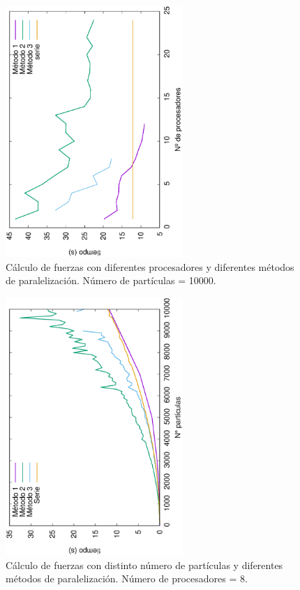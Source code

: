 \documentclass[onecolumn]{article}
\begin{document}
\begin{figure}[h]
\begin{center}
\includegraphics[width=0.6\textwidth, angle=-90]{forces_proc3.eps}
\caption{Cálculo de fuerzas con diferentes procesadores y diferentes métodos de paralelización. Número de partículas = 10000.}
\label{xabi_2}
\end{center}
\end{figure}

\begin{figure}[h]
\begin{center}
\includegraphics[width=0.6\textwidth, angle=-90]{time_particlesEX.eps}
\caption{Cálculo de fuerzas con distinto número de partículas y diferentes métodos de paralelización. Número de procesadores = 8. }
\label{xabielena}
\end{center}
\end{figure}
\end{document}
